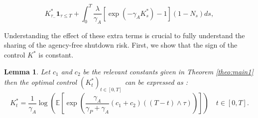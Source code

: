 \documentclass[numbook, envcountsect, envcountsame, envcountreset, runningheads, smallextended]{article}
\newtheorem{Lemma}{Lemma}[part]
\def \E{\mathbb{E}}
\begin{document}
\begin{equation}
\label{extraK}
 K^*_{\tau_{-}} \textbf{1}_{\tau \leq T}  + \int_0^T  \frac{\lambda}{\gamma_A} [\exp(-\gamma_A K^*_s) - 1 ](1-N_s) ds, 
\end{equation}

Understanding the effect of these extra terms is crucial to fully understand the sharing of the agency-free shutdown risk.
First, we show that the sign of the control $K^*$ is constant.

\begin{Lemma}
\label{lemma:K}
Let $c_1$ and $c_2$ be the relevant constants given in Theorem \ref{theo:main1} then the optimal control $(K^*_t)_{t \in [0,T]}$ can be expressed as : 
\begin{equation}\label{Kversion2}
 K_t^* =  \frac{1}{\gamma_A} \log\left(\E\left[\exp\left(\frac{\gamma_A}{\gamma_P+\gamma_A}(c_1+c_2)((T-t) \wedge \tau)\right)\right]\right)\quad t \in [0,T]. 
 \end{equation}
\end{Lemma}
\end{document}

